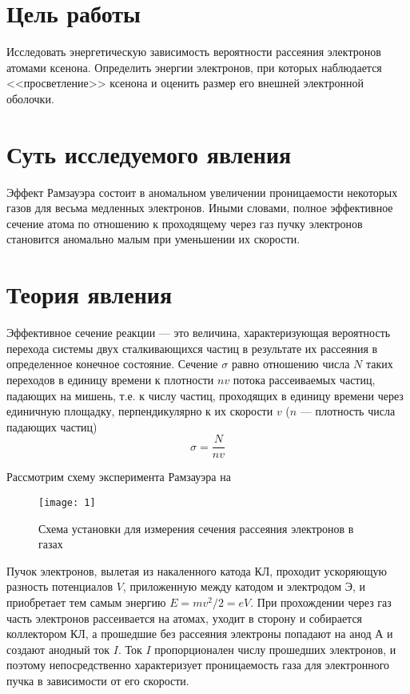 \documentclass[a4paper, 12pt]{article}
\begin{document}

\section{Цель работы}
Исследовать энергетическую зависимость вероятности рассеяния
электронов атомами ксенона. Определить энергии электронов, при
которых наблюдается <<просветление>> ксенона и оценить размер его
внешней электронной оболочки.



\section{Суть исследуемого явления}
Эффект Рамзауэра состоит в аномальном увеличении проницаемости
некоторых газов для весьма медленных электронов. Иными словами, полное
эффективное сечение атома по отношению к проходящему через газ пучку
электронов становится аномально малым при уменьшении их скорости.

\section{Теория явления}
Эффективное сечение реакции --- это величина, характеризующая
вероятность перехода системы двух сталкивающихся частиц в результате
их рассеяния в определенное конечное состояние. Сечение $\sigma$ равно
отношению числа $N$ таких переходов в единицу времени к плотности $nv$
потока рассеиваемых частиц, падающих на мишень, т.е. к числу частиц,
проходящих в единицу времени через единичную площадку, перпендикулярно
к их скорости $v$ ($n$ --- плотность числа падающих частиц)
\begin{equation}
    \sigma = \frac{N}{n v}
    \label{eq:1}
\end{equation}

Рассмотрим схему эксперимента Рамзауэра на 

\begin{wrapfigure}{l}{0.4\linewidth}
    \texttt{[image: 1]}
    \caption{Схема установки для измерения сечения рассеяния
    электронов в газах}
    \label{fig:1}
\end{wrapfigure}

Пучок электронов, вылетая из накаленного катода КЛ, проходит
ускоряющую разность потенциалов $V$, приложенную между катодом и
электродом Э, и приобретает тем самым энергию $E=mv^2/2=eV$.
При прохождении через газ часть электронов рассеивается на атомах,
уходит в сторону и собирается коллектором КЛ, а прошедшие без рассеяния
электроны попадают на анод А и создают анодный ток $I$. Ток $I$
пропорционален числу прошедших электронов, и поэтому непосредственно
характеризует проницаемость газа для электронного пучка в зависимости
от его скорости.
\end{document}
